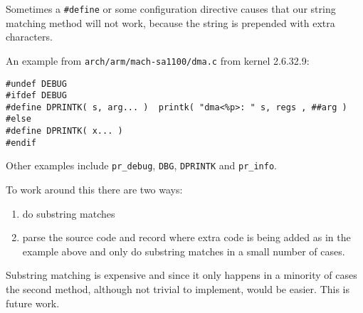 \documentclass[10pt]{article}
\begin{document}
Sometimes a \texttt{\#define} or some configuration directive causes that our 
string matching method will not work, because the string is prepended with
extra characters.

An example from \texttt{arch/arm/mach-sa1100/dma.c} from kernel 2.6.32.9:

\begin{verbatim}
#undef DEBUG
#ifdef DEBUG
#define DPRINTK( s, arg... )  printk( "dma<%p>: " s, regs , ##arg )
#else
#define DPRINTK( x... )
#endif
\end{verbatim}

Other examples include \texttt{pr\_debug}, \texttt{DBG}, \texttt{DPRINTK} and
\texttt{pr\_info}.

To work around this there are two ways:

\begin{enumerate}
\item do substring matches
\item parse the source code and record where extra code is being added as in
the example above and only do substring matches in a small number of cases.
\end{enumerate}

Substring matching is expensive and since it only happens in a minority of
cases the second method, although not trivial to implement, would be easier.
This is future work.
\end{document}
